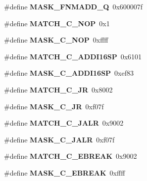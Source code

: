 \begin{DoxyCompactItemize}
\#define {\bfseries M\+A\+S\+K\+\_\+\+F\+N\+M\+A\+D\+D\+\_\+Q}~0x600007f
\item 
\mbox{\label{riscv-utility_8h_a00b1d1aef9e222c95434a84e8e7d94e6}} 
\#define {\bfseries M\+A\+T\+C\+H\+\_\+\+C\+\_\+\+N\+OP}~0x1
\item 
\mbox{\label{riscv-utility_8h_aab000ee349355268a75adbf7b37b2bfa}} 
\#define {\bfseries M\+A\+S\+K\+\_\+\+C\+\_\+\+N\+OP}~0xffff
\item 
\mbox{\label{riscv-utility_8h_a5ff79b07f4616437f2ec63a15372f72b}} 
\#define {\bfseries M\+A\+T\+C\+H\+\_\+\+C\+\_\+\+A\+D\+D\+I16\+SP}~0x6101
\item 
\mbox{\label{riscv-utility_8h_a62d2d2723e66c7e1ff01ae0903cc2f74}} 
\#define {\bfseries M\+A\+S\+K\+\_\+\+C\+\_\+\+A\+D\+D\+I16\+SP}~0xef83
\item 
\mbox{\label{riscv-utility_8h_ac0767e8575716acf98c32eef8d428048}} 
\#define {\bfseries M\+A\+T\+C\+H\+\_\+\+C\+\_\+\+JR}~0x8002
\item 
\mbox{\label{riscv-utility_8h_afa26465fb68a2e7fb88dfb81a5e9789e}} 
\#define {\bfseries M\+A\+S\+K\+\_\+\+C\+\_\+\+JR}~0xf07f
\item 
\mbox{\label{riscv-utility_8h_a28249ff06f5fd32b119fba965007fc1c}} 
\#define {\bfseries M\+A\+T\+C\+H\+\_\+\+C\+\_\+\+J\+A\+LR}~0x9002
\item 
\mbox{\label{riscv-utility_8h_ad7997fcfcc631c2a6d88571e2d52397a}} 
\#define {\bfseries M\+A\+S\+K\+\_\+\+C\+\_\+\+J\+A\+LR}~0xf07f
\item 
\mbox{\label{riscv-utility_8h_a571aabf05ac4c7c2f1e6c946f81b60dc}} 
\#define {\bfseries M\+A\+T\+C\+H\+\_\+\+C\+\_\+\+E\+B\+R\+E\+AK}~0x9002
\item 
\mbox{\label{riscv-utility_8h_ae2d5de3f9d9f816e3b5f9f20b88ffe10}} 
\#define {\bfseries M\+A\+S\+K\+\_\+\+C\+\_\+\+E\+B\+R\+E\+AK}~0xffff
\item 
\mbox{\label{riscv-utility_8h_ab76cdb0a5ca962d3e6e345759145655b}} 

\end{DoxyCompactItemize}
